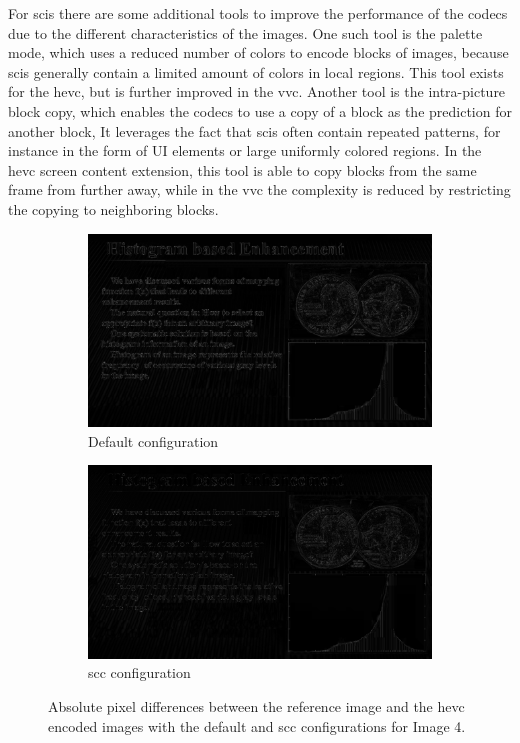 For \glspl{sci} there are some additional tools \cite{vvc_2021} to improve the performance of the codecs due to the different characteristics of the images.
One such tool is the palette mode, which uses a reduced number of colors to encode blocks of images, because \glspl{sci} generally contain a limited amount of colors in local regions.
This tool exists for the \gls{hevc}, but is further improved in the \gls{vvc}.
Another tool is the intra-picture block copy, which enables the codecs to use a copy of a block as the prediction for another block,
It leverages the fact that \glspl{sci} often contain repeated patterns, for instance in the form of UI elements or large uniformly colored regions.
In the \gls{hevc} screen content extension, this tool is able to copy blocks from the same frame from further away, while in the \gls{vvc} the complexity is reduced by restricting the copying to neighboring blocks.
\begin{figure}
    \centering
    \begin{subfigure}[b]{0.45\textwidth}
        \includegraphics[width=\linewidth]{../images/codec_hm_default_diff_50_SCI4.png}
        \caption{Default configuration}
        \label{fig:codec_hm_default_diff_50_SCI4}
    \end{subfigure}
    \hfill
    \begin{subfigure}[b]{0.45\textwidth}
        \includegraphics[width=\linewidth]{../images/codec_hm_scc_diff_50_SCI4.png}
        \caption{\gls{scc} configuration}
        \label{fig:codec_hm_scc_diff_50_SCI4}
    \end{subfigure}
    \caption{Absolute pixel differences between the reference image and the \gls{hevc} encoded images with the default and \gls{scc} configurations for Image 4.}
    \label{fig:codec_hm_diff_50_SCI4}
\end{figure}
